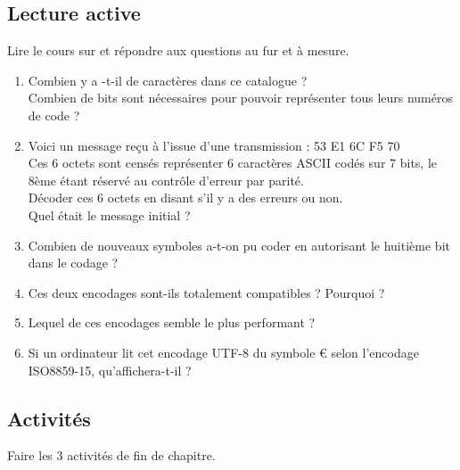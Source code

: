 \documentclass[a4paper,12pt,french]{article}
\begin{document}

\subsection*{Lecture active}

Lire le cours sur  et répondre aux questions au fur et à mesure.

\begin{enumerate}[\bfseries 1.]
	\item 	Combien y a -t-il de caractères dans ce catalogue ?\\
            Combien de bits sont nécessaires pour pouvoir représenter tous leurs numéros de code ?
	\item 	Voici un message reçu à l'issue d'une transmission : 53 E1 6C F5 70\\
            Ces 6 octets sont censés représenter 6 caractères ASCII codés sur 7 bits, le 8ème étant réservé au contrôle d'erreur par parité.\\
            Décoder ces 6 octets en disant s'il y a des erreurs ou non.\\
            Quel était le message initial ?
    \item   Combien de nouveaux symboles a-t-on pu coder en autorisant le huitième bit dans le codage ?
    \item   Ces deux encodages sont-ils totalement compatibles ? Pourquoi ?
    \item   Lequel de ces encodages semble le plus performant ?
    \item   Si un ordinateur lit cet encodage UTF-8 du symbole € selon l'encodage ISO8859-15, qu'affichera-t-il ?
\end{enumerate}

\subsection*{Activités}

Faire les 3 activités de fin de chapitre.
\end{document}

